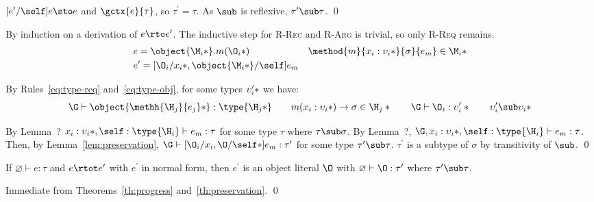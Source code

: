 \begin{theorem}[Preservation]
\begin{lemma}
\begin{lproof}
\begin{lcase}[S-Self: $e = \object{\*\M_i*}, \xs = \self$]
$[e^\prime/\self]e \sto e$ and $\gctx{e}{\tau}$, so
$\tau^\prime = \tau$.  As $\sub$ is reflexive, $\tau^\prime \sub \tau$. \qed
\end{lcase}

\end{lproof}

\end{lemma}

\begin{tproof}

By induction on a derivation of $e \rto e^\prime$.  The inductive step for
\textsc{R-Rec} and \textsc{R-Arg} is trivial, so only \textsc{R-Req} remains.
\begin{align*}
&e = \object{\*\M_i*}.m(\*\O_i*) &
\method{m}{\*x_i : \upsilon_i*}{\sigma}{e_m} \in \*\M_i* \\
&e^\prime = [\*\O_i/x_i*, \object{\*\M_i*}/\self]e_m &
\end{align*}

\noindent By Rules~\ref{eq:type-req} and~\ref{eq:type-obj}, for some types
$\*\upsilon^\prime_i*$ we have:
\begin{displaymath}
\G \vdash \object{\*\methh{\H_j}{e_j}*} : \type{\*\H_j*} \quad\quad
m(\*x_i : \upsilon_i*) \to \sigma \in \*\H_j* \quad\quad
\G \vdash \*\O_i : \upsilon^\prime_i* \quad\quad
\*\upsilon^\prime_i \sub \upsilon_i*
\end{displaymath}

\noindent By Lemma~?
$\*x_i : \upsilon_i*, \self : \type{\H_i} \vdash e_m : \tau$ for some type
$\tau$ where $\tau \sub \sigma$.  By Lemma~?,
$\G, \*x_i : \upsilon_i*, \self : \type{\H_i} \vdash e_m : \tau$.  Then, by
Lemma~\ref{lem:preservation},
$\G \vdash [\*\O_i/x_i,\O/\self*]e_m : \tau^\prime$ for some type
$\tau^\prime \sub \tau$.  $\tau^\prime$ is a subtype of $\sigma$ by transitivity
of $\sub$. \qed

\end{tproof}

\end{theorem}

\begin{theorem}
\label{th:type-soundness}

If $\varnothing \vdash e : \tau$ and $e \rtot e^\prime$ with $e^\prime$ in
normal form, then $e^\prime$ is an object literal $\O$ with
$\varnothing \vdash \O : \tau^\prime$ where $\tau^\prime \sub \tau$.

\begin{tproof}
Immediate from Theorems~\ref{th:progress} and~\ref{th:preservation}. \qed
\end{tproof}

\end{theorem}

